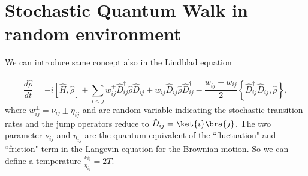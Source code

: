 \begin{comment}
Thus, the master equation becomes 
\begin{equation}
    \dot \rho(t) = -L\rho(t) + \sqrt{2T}\xi(t)\rho(t)
\end{equation} 

This system will never reach a stationary solution due to the continuos fluctuations that change the network structure. But the averages distribution probability converges  instead converge 

Since, in average, the transition rates are symmetric, the system must hold the detail condition in average. Thus, the limit distribution is 

If consider the base of the eigenstate of $L$, the perturbation remain gaussian (orthogonal transformation does not change the white noise and the fourier transformation neither). Therefore, we can write
\begin{eqnarray}
    \dot \rho_\lambda = -\lambda\rho_\lambda +  \sum_{\mu\neq0}\sqrt{2T}\xi_{\lambda\mu}(t)\rho_\mu(t).
\end{eqnarray}
The zero eigenstate does not interact with the thermal bath.
Now, we can consider the average detail condition
\begin{equation}
    \begin{split}
        \left<\frac{\pi_{\lambda\mu}(t)}{\pi_{\mu\lambda}(t)}\right> &= \left<e^{}\right> =\\
    \end{split}
\end{equation}

\end{comment}

\section{Stochastic Quantum Walk in random environment}
We can introduce same concept also in the Lindblad equation \cite{Anvit_Cohen, Shapira_Cohen}

\begin{equation}\label{superstocahstic_master_equation}
    \frac{d\hat\rho}{dt} = -i\left[\hat H, \hat \rho\right] + \sum_{i<j}  w_{ij}^+\hat D_{ij}^\dagger\hat\rho\hat D_{ij} + w_{ij}^-\hat D_{ij}\hat\rho\hat D_{ij}^\dagger - \frac{w_{ij}^++w_{ij}^-}{2}\left\{ \hat D_{ij}^\dagger \hat D_{ij}, \hat\rho\right\}, 
\end{equation}
where $w_{ij}^\pm =  \nu_{ij} \pm \eta_{ij}$ and are random variable indicating the stochastic transition rates and the jump operators reduce to $\hat D_{ij} = \ket{i}\bra{j}$. The two parameter $\nu_{ij}$ and $\eta_{ij}$ are the quantum equivalent of the “fluctuation" and “friction" term in the Langevin equation for the Brownian motion. So we can define a temperature $\frac{\nu_{ij}}{\eta_{ij}} = 2T $.


